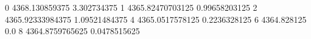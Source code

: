 0 4368.130859375 3.302734375
1 4365.82470703125 0.99658203125
2 4365.92333984375 1.09521484375
4 4365.0517578125 0.2236328125
6 4364.828125 0.0
8 4364.8759765625 0.0478515625
